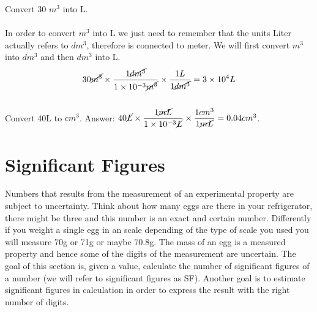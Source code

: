 \documentclass[main.tex]{subfiles}
\begin{document}
\begin{description}
\begin{example} %
Convert 30 $m^3$ into L.\\
\\
In order to convert $m^3$ into L we just need to remember that the units Liter actually refers to $dm^3$, therefore is connected to meter. We will first convert $m^3$ into $dm^3$ and then $dm^3$ into L.
 \begin{equation*}
30\cancel{m^3} \times \dfrac{1 \cancel{dm^3}}{1\times10^{-3}\cancel{m^3}}   \times  \dfrac{1L}{1\cancel{dm^3}} =3\times 10^{4}L
\end{equation*}
\faDiamond\ \\
Convert 40L to $cm^3$.
\flushright Answer: $40\cancel{L} \times \dfrac{1\cancel{mL}}{1\times10^{-3}\cancel{L}} \times \dfrac{1cm^3}{1\cancel{mL}}=0.04cm^3$.
\end{example}%



\end{description}


\section{Significant Figures}
Numbers that results from the measurement of an experimental property are subject to uncertainty. Think about how many eggs are there in your refrigerator, there might be three and this number is an exact and certain number. Differently if you weight a single egg in an scale depending of the type of scale you used you will measure 70g or 71g or maybe 70.8g. The mass of an egg is a measured property and hence some of the digits of the measurement are uncertain. The goal of this section is, given a value, calculate the number of significant figures of a number (we will refer to significant figures as SF). Another goal is to estimate significant figures in calculation in order to express the result with the right number of digits.
\end{document}
